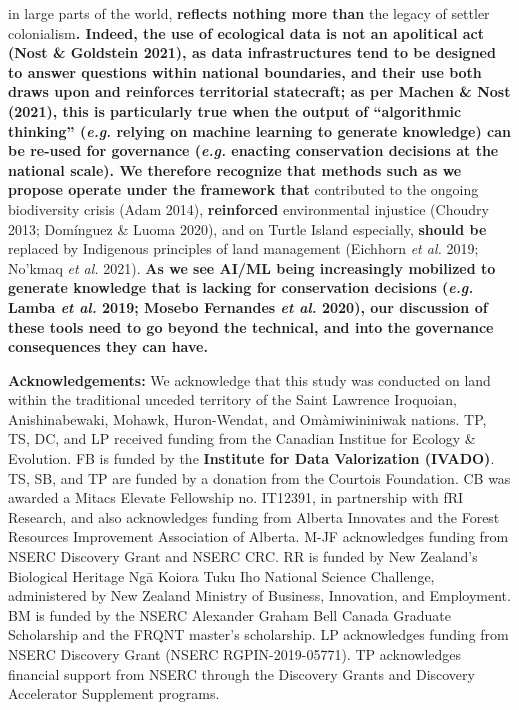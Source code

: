 \documentclass[11pt]{article}
\makeatletter
\def\maxwidth{\ifdim\Gin@nat@width>\linewidth\linewidth
\else\Gin@nat@width\fi}
\let\Oldincludegraphics\includegraphics
\renewcommand{\includegraphics}[1]{\Oldincludegraphics[width=\maxwidth]{#1}}
\providecommand{\DIFaddtex}[1]{{\bf #1}} %
\providecommand{\DIFdeltex}[1]{} %
\providecommand{\DIFaddbegin}{\protect\color{blue}} %
\providecommand{\DIFaddend}{\protect\color{black}} %
\providecommand{\DIFdelbegin}{\protect\color{red}} %
\providecommand{\DIFdelend}{\protect\color{black}} %
\providecommand{\DIFadd}[1]{\texorpdfstring{\DIFaddtex{#1}}{#1}} %
\providecommand{\DIFdel}[1]{\texorpdfstring{\DIFdeltex{#1}}{}} %
\newcommand{\DIFscaledelfig}{0.5}
\newlength{\DIFdelgraphicswidth} %
\newlength{\DIFdelgraphicsheight} %
\newcommand{\DIFaddincludegraphics}[2][]{{\color{blue}\fbox{\DIFOincludegraphics[#1]{#2}}}} %
\newcommand{\DIFdelincludegraphics}[2][]{%
\sbox{\DIFdelgraphicsbox}{\DIFOincludegraphics[#1]{#2}}%
\settoboxwidth{\DIFdelgraphicswidth}{\DIFdelgraphicsbox} %
\settoboxtotalheight{\DIFdelgraphicsheight}{\DIFdelgraphicsbox} %
\scalebox{\DIFscaledelfig}{%
\parbox[b]{\DIFdelgraphicswidth}{\usebox{\DIFdelgraphicsbox}\\[-\baselineskip] \rule{\DIFdelgraphicswidth}{0em}}\llap{\resizebox{\DIFdelgraphicswidth}{\DIFdelgraphicsheight}{%
\setlength{\unitlength}{\DIFdelgraphicswidth}%
\begin{picture}(1,1)%
\thicklines\linethickness{2pt} %
{\color[rgb]{1,0,0}\put(0,0){\framebox(1,1){}}}%
{\color[rgb]{1,0,0}\put(0,0){\line( 1,1){1}}}%
{\color[rgb]{1,0,0}\put(0,1){\line(1,-1){1}}}%
\end{picture}%
}\hspace*{3pt}}} %
} %
\DeclareRobustCommand{\DIFaddbegin}{\DIFOaddbegin \let\includegraphics\DIFaddincludegraphics} %
\DeclareRobustCommand{\DIFaddend}{\DIFOaddend \let\includegraphics\DIFOincludegraphics} %
\DeclareRobustCommand{\DIFdelbegin}{\DIFOdelbegin \let\includegraphics\DIFdelincludegraphics} %
\DeclareRobustCommand{\DIFdelend}{\DIFOaddend \let\includegraphics\DIFOincludegraphics} %
\makeatother
\begin{document}
in large parts of the world, \DIFdelbegin \DIFdel{reflect nothing except for }\DIFdelend \DIFaddbegin \DIFadd{reflects nothing more than }\DIFaddend the legacy of
settler colonialism\DIFdelbegin \DIFdel{, and operating under them
must be done under the clear realization that
they }\DIFdelend \DIFaddbegin \DIFadd{. Indeed, the use of ecological data is not an
apolitical act (Nost \& Goldstein 2021), as data infrastructures tend to
be designed to answer questions within national boundaries, and their
use both draws upon and reinforces territorial statecraft; as per Machen
\& Nost (2021), this is particularly true when the output of
``algorithmic thinking'' (\emph{e.g.} relying on machine learning to
generate knowledge) can be re-used for governance (\emph{e.g.} enacting
conservation decisions at the national scale). We therefore recognize
that methods such as we propose operate under the framework that
}\DIFaddend contributed to the ongoing biodiversity crisis (Adam 2014), \DIFdelbegin \DIFdel{can reinforce }\DIFdelend \DIFaddbegin \DIFadd{reinforced
}\DIFaddend environmental injustice (Choudry 2013; Domínguez \& Luoma 2020), and on
Turtle Island especially, \DIFdelbegin \DIFdel{will probably end up being }\DIFdelend \DIFaddbegin \DIFadd{should be }\DIFaddend replaced by Indigenous principles of
land management (Eichhorn \emph{et al.} 2019; No'kmaq \emph{et al.}
2021). \DIFaddbegin \DIFadd{As we see AI/ML being increasingly mobilized to generate
knowledge that is lacking for conservation decisions (\emph{e.g.} Lamba
\emph{et al.} 2019; Mosebo Fernandes \emph{et al.} 2020), our discussion
of these tools need to go beyond the technical, and into the governance
consequences they can have.
}\DIFaddend 

\textbf{Acknowledgements:} We acknowledge that this study was conducted
on land within the traditional unceded territory of the Saint Lawrence
Iroquoian, Anishinabewaki, Mohawk, Huron-Wendat, and Omàmiwininiwak
nations. TP, TS, DC, and LP received funding from the Canadian Institue
for Ecology \& Evolution. FB is funded by the \DIFdelbegin \DIFdel{Institut de Valorisation
des Données}\DIFdelend \DIFaddbegin \DIFadd{Institute for Data
Valorization (IVADO)}\DIFaddend . TS, SB, and TP are funded by a donation from the
Courtois Foundation. CB was awarded a Mitacs Elevate Fellowship no.
IT12391, in partnership with fRI Research, and also acknowledges funding
from Alberta Innovates and the Forest Resources Improvement Association
of Alberta. M-JF acknowledges funding from NSERC Discovery Grant and
NSERC CRC. RR is funded by New Zealand's Biological Heritage Ngā Koiora
Tuku Iho National Science Challenge, administered by New Zealand
Ministry of Business, Innovation, and Employment. BM is funded by the
NSERC Alexander Graham Bell Canada Graduate Scholarship and the FRQNT
master's scholarship. LP acknowledges funding from NSERC Discovery Grant
(NSERC RGPIN-2019-05771). TP acknowledges financial support from NSERC
through the Discovery Grants and Discovery Accelerator Supplement
programs.
\end{document}
